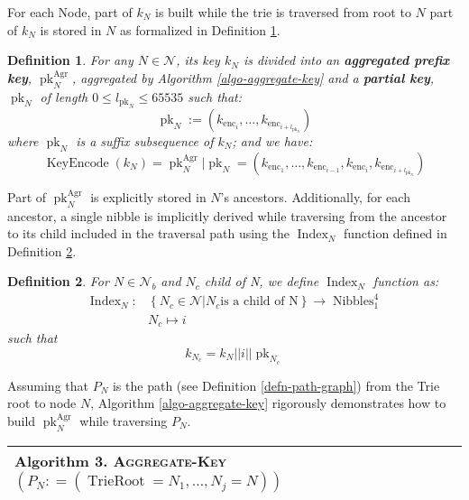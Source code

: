 \documentclass{article}
\newcommand{\assign}{:=}
\newcommand{\tmname}[1]{\textsc{#1}}
\newcommand{\tmop}[1]{\ensuremath{\operatorname{#1}}}
\newcommand{\tmstrong}[1]{\textbf{#1}}
\newcommand{\tmtextbf}[1]{{\bfseries{#1}}}
\newcommand{\tmtextsc}[1]{{\scshape{#1}}}
\newcounter{tmcounter}
\newcommand{\custombinding}[1]{%
  \setcounter{tmcounter}{#1}%
  \addtocounter{tmcounter}{-1}%
  \refstepcounter{tmcounter}}
\newtheorem{definition}{Definition}
\providecommand{\tmname}[1]{\tmtextsc{#1}}
\providecommand{\tmop}[1]{\ensuremath{\mathrm{#1}}}
\providecommand{\tmstrong}[1]{\tmtextbf{#1}}
\providecommand{\tmtextbf}[1]{\tmtextbf{#1}}
\newtheorem{definition}{Definition}
\begin{document}
For each Node, part of $k_N$ is built while the trie is traversed from root to
$N$ part of $k_N$ is stored in $N$ as formalized in Definition
\ref{defn-node-key}.

\begin{definition}
  \label{defn-node-key}For any $N \in \mathcal{N}$, its key $k_N$ is divided
  into an {\tmstrong{aggregated prefix key}},
  {\tmstrong{$\tmop{pk}_N^{\tmop{Agr}}$}}, aggregated by Algorithm
  \ref{algo-aggregate-key} and a {\tmstrong{partial key}},
  {\tmstrong{$\tmop{pk}_N$}} of length $0 \leqslant l_{\tmop{pk}_N} \leqslant
  65535$ such that:
  \[ \tmop{pk}_N \assign (k_{\tmop{enc}_i}, \ldots, k_{\tmop{enc}_{i +
     l_{\tmop{pk}_N}}}) \]
  where $\tmop{pk}_N$ is a suffix subsequence of $k_N$; and we have:
  \[ \tmop{KeyEncode} (k_N) = \tmop{pk}_N^{\tmop{Agr}} | \tmop{pk}_N =
     (k_{\tmop{enc}_1}, \ldots, k_{\tmop{enc}_{i - 1}}, k_{\tmop{enc}_i},
     k_{\tmop{enc}_{i + l_{\tmop{pk}_N}}}) \]
\end{definition}

Part of $\tmop{pk}_N^{\tmop{Agr}}$ is explicitly stored in $N$'s ancestors.
Additionally, for each ancestor, a single nibble is implicitly derived while
traversing from the ancestor to its child included in the traversal path using
the $\tmop{Index}_N$ function defined in Definition \ref{defn-index-function}.

\begin{definition}
  \label{defn-index-function}For $N \in \mathcal{N}_b$ and $N_c$ child of N,
  we define {\tmstrong{$\tmop{Index}_N$}} function as:
  \[ \begin{array}{cc}
       \tmop{Index}_N : & \left\{ N_c \in \mathcal{N}|N_c  \text{is a child of
       N} \right\} \rightarrow \tmop{Nibbles}^4_1\\
       & N_c \mapsto i_{}
     \end{array} \]
  such that
  \[ k_{N_c} = k_N | | i | | \tmop{pk}_{N_c} \]
\end{definition}

Assuming that $P_N$ is the path (see Definition \ref{defn-path-graph}) from
the Trie root to node $N$, Algorithm \ref{algo-aggregate-key} rigorously
demonstrates how to build $\tmop{pk}^{\tmop{Agr}}_N$ while traversing $P_N$.

\custombinding{3}{\noindent}\begin{tabular}{l}
  \hline
  \tmtextbf{Algorithm  3. }
  \label{algo-aggregate-key}{\tmname{Aggregate-Key}}$(P_N : = (\tmop{TrieRoot}
  = N_1, \ldots, N_j = N))$\\
  \hline
\end{tabular}
\end{document}
